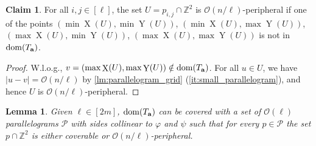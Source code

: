 \documentclass[11pt, letterpaper]{article}
\theoremstyle{plain}
\newtheorem{lemma}{Lemma}
\theoremstyle{definition}
\newtheorem{claim}{Claim}
\theoremstyle{remark}
\newcommand{\Z}{\mathbb{Z}}
\renewcommand{\O}{\mathcal{O}}
\renewcommand{\phi}{\varphi}
\DeclareMathOperator*{\X}{X}
\DeclareMathOperator*{\Y}{Y}
\newcommand{\absolute}[1]{\left\lvert#1\right\rvert}
\begin{document}
\begin{claim}\label{peripheral}
For all $i,j \in [\ell]$, the set $U = p_{i,j} \cap \Z^2$ is $\O(n / \ell)$-peripheral if one of the points $(\min \X(U), \min \Y(U))$, $(\min \X(U), \max \Y(U))$, $(\max \X(U), \min \Y(U))$, $(\max \X(U), \max \Y(U))$ is not in $\operatorname*{dom}(T_\mathbf{a})$.
\end{claim}
\begin{proof}
W.l.o.g., $v = (\max \X(U), \max \Y(U)) \notin \d{\Ta}$. For all $u \in U$, we have $\absolute{u-v} = \O(n / \ell)$ by \cref{lm:parallelogram_grid} (\ref{it:small_parallelogram}), and hence $U$ is $\O(n / \ell)$-peripheral.
\end{proof}

\begin{lemma}\label{lm:parallelogram_merge}
Given $\ell \in [2m]$, $\operatorname*{dom}(T_\mathbf{a})$ can be covered with a set of $\O(\ell)$ parallelograms $\mathcal{P}$ with sides collinear to $\phi$ and $\psi$ such that for every $p \in \mathcal{P}$ the set $p \cap \Z^2$ is either coverable or $\O(n / \ell)$-peripheral. 
\end{lemma}
\end{document}
